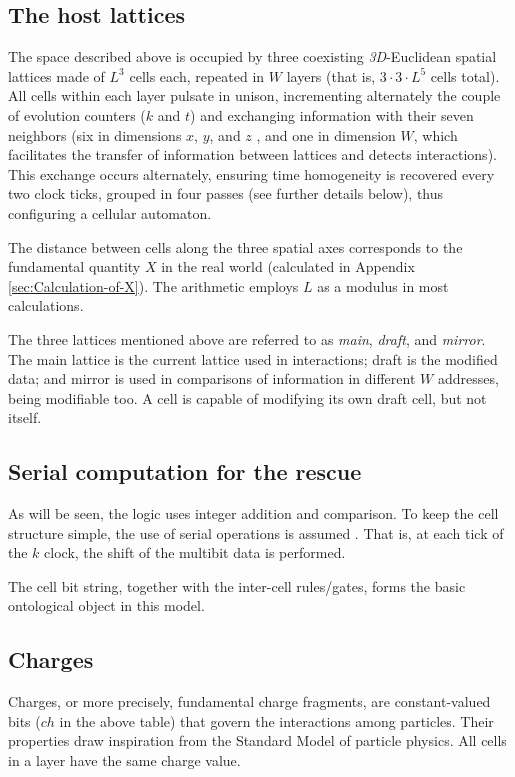 \documentclass[12pt]{article}
\begin{document}
\subsection{The host lattices\label{subsec:The-host-lattice}}

The space described above is occupied by three coexisting \emph{3D}-Euclidean spatial lattices made of $L^{3}$ cells each, repeated in $W  $ layers (that is, $3\cdot3\cdot L^{5}$ cells total). All cells within each layer pulsate in unison, incrementing alternately the couple of evolution counters ($k$ and $t$) and exchanging information with their seven neighbors (six in dimensions $x$, $y$, and \ensuremath{z} , and one in dimension $W  $, which facilitates the transfer of information between lattices and detects interactions). This exchange occurs alternately, ensuring time homogeneity is recovered every two clock ticks, grouped in four passes (see further details below), thus configuring a cellular automaton. 

The distance between cells along the three spatial axes corresponds to the fundamental quantity $X$ in the real world (calculated in Appendix \ref{sec:Calculation-of-X}). The arithmetic employs $L$ as a modulus in most calculations.

The three lattices mentioned above are referred to as \textit{main}, \textit{draft}, and \textit{mirror}. The main lattice is the current lattice used in interactions; draft is the modified data; and mirror is used in comparisons of information in different $W  $ addresses, being modifiable too. A cell is capable of modifying its own draft cell, but not itself.

\subsection{Serial computation for the rescue}

As will be seen, the logic uses integer addition and comparison. To keep the cell structure simple, the use of serial operations is assumed \cite{mano1993csa}. That is, at each tick of the $k$ clock, the shift of the multibit data is performed.

The cell bit string, together with the inter-cell rules/gates, forms the basic ontological object in this model.

\subsection{Charges}
Charges, or more precisely, fundamental charge fragments, are constant-valued bits ($ch$ in the above table) that govern the interactions among particles. Their properties draw inspiration from the Standard Model of particle physics. All cells in a layer have the same charge value.
\end{document}
